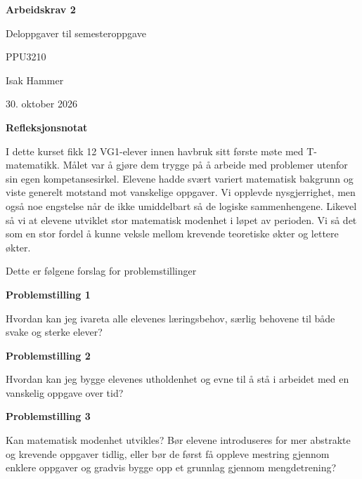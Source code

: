\documentclass[10pt,a4paper,landscape]{article}
\begin{document}
\begin{titlepage}
  \centering
  \vspace*{22mm}
  {\LARGE\bfseries Arbeidskrav 2\par}
  \vspace{6mm}
  {\Large Deloppgaver til semesteroppgave\par}
  \vspace{10mm}
  {\large PPU3210\par}
  \vspace{12mm}
  {\large Isak Hammer\par}
  \vspace{5mm}
  {\large 30. oktober 2026\par}
\end{titlepage}

\vspace*{4mm}
{\centering\fontsize{16}{19}\selectfont\bfseries Refleksjonsnotat\par}
\vspace{7mm}

I dette kurset fikk 12 VG1-elever innen havbruk sitt første møte med T-matematikk. Målet var å gjøre
dem trygge på å arbeide med problemer utenfor sin egen kompetansesirkel. Elevene hadde svært variert
matematisk bakgrunn og viste generelt motstand mot vanskelige oppgaver. Vi opplevde nysgjerrighet,
men også noe engstelse når de ikke umiddelbart så de logiske sammenhengene. Likevel så vi at elevene
utviklet stor matematisk modenhet i løpet av perioden. Vi så det som en stor fordel å kunne veksle
mellom krevende teoretiske økter og lettere økter.

\par\vspace{8mm}
Dette er følgene forslag for problemstillinger
\par\vspace{4mm}
\textbf{Problemstilling 1}
\par\smallskip
Hvordan kan jeg ivareta alle elevenes læringsbehov, særlig behovene til både svake og sterke elever?
\par\vspace{15mm}

\textbf{Problemstilling 2}
\par\smallskip
Hvordan kan jeg bygge elevenes utholdenhet og evne til å stå i arbeidet med en vanskelig oppgave over tid?
\par\vspace{15mm}

\textbf{Problemstilling 3}
\par\smallskip
Kan matematisk modenhet utvikles? Bør elevene introduseres for mer abstrakte og krevende oppgaver
tidlig, eller bør de først få oppleve mestring gjennom enklere oppgaver og gradvis bygge opp et
grunnlag gjennom mengdetrening?
\par\vspace{15mm}
\end{document}
